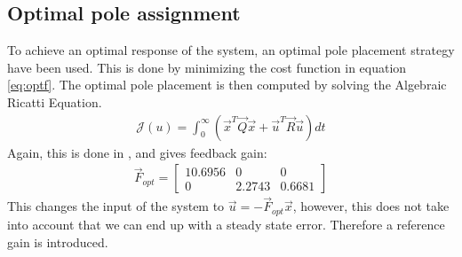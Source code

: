 \subsection{Optimal pole assignment}
To achieve an optimal response of the system, an optimal pole placement strategy have been used. This is done by minimizing the cost function in equation \vref{eq:optf}. The optimal pole placement is then computed by solving the Algebraic Ricatti Equation. 
\begin{align}
\mathcal{J}(u)=\int_{0}^{\infty} (\vec{x}^T \vec{Q} \vec{x} + \vec{u}^T \vec{R} \vec{u}) dt
\label{eq:optf}
\end{align}
Again, this is done in \MATLAB, and gives feedback gain:
\begin{align}
\vec{F}_{opt} = \begin{bmatrix}
10.6956 & 0 & 0\\
0 & 2.2743 & 0.6681
\end{bmatrix}
\end{align}
This changes the input of the system to $\vec{u} = -\vec{F}_{opt}\vec{x}$, however, this does not take into account that we can end up with a steady state error. Therefore a reference gain is introduced. 


